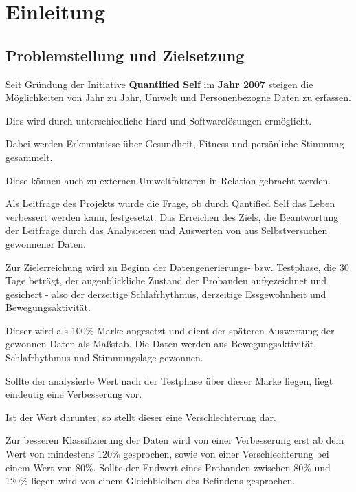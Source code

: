 
\chapter{Einleitung}
\label{ch:Einleitung}

\section{Problemstellung und Zielsetzung}
\label{ch:Einleitung:sec:problemstellung-und-zielsetzung}

Seit Gründung der Initiative \href{http://quantifiedself.com/}{\textbf{Quantified Self}} im \href{http://quantifiedself.com/2011/03/what-is-the-quantified-self/}{\textbf{Jahr 2007}} steigen die Möglichkeiten von Jahr zu Jahr, Umwelt und Personenbezogne Daten zu erfassen. 

Dies wird durch unterschiedliche Hard und Softwarelösungen ermöglicht. 

Dabei werden Erkenntnisse über Gesundheit, Fitness und persönliche Stimmung gesammelt.

Diese können auch zu externen Umweltfaktoren in Relation gebracht werden.

Als Leitfrage des Projekts wurde die Frage, ob durch Qantified Self das Leben verbessert werden kann, festgesetzt. Das Erreichen des Ziels, die Beantwortung der Leitfrage durch das Analysieren und Auswerten von aus Selbstversuchen gewonnener Daten.

Zur Zielerreichung wird zu Beginn der Datengenerierungs- bzw. Testphase, die 30 Tage beträgt, der augenblickliche Zustand der Probanden aufgezeichnet und gesichert - also der derzeitige Schlafrhythmus, derzeitige Essgewohnheit und Bewegungsaktivität. 

Dieser wird als 100\% Marke angesetzt und dient der späteren Auswertung der gewonnen Daten als Maßstab. Die Daten werden aus Bewegungsaktivität, Schlafrhythmus und Stimmungslage gewonnen. 

Sollte der analysierte Wert nach der Testphase über dieser Marke liegen, liegt eindeutig eine Verbesserung vor. 

Ist der Wert darunter, so stellt dieser eine Verschlechterung dar. 

Zur besseren Klassifizierung der Daten wird von einer Verbesserung erst ab dem Wert von mindestens 120\% gesprochen, sowie von einer Verschlechterung bei einem Wert von 80\%. Sollte der Endwert eines Probanden zwischen 80\% und 120\% liegen wird von einem Gleichbleiben des Befindens gesprochen.

